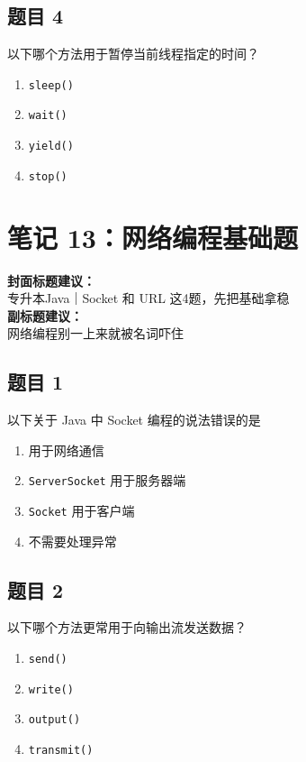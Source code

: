 \documentclass[12pt,a4paper]{ctexart}
\begin{document}
\subsection*{题目 4}
以下哪个方法用于暂停当前线程指定的时间？
\begin{enumerate}[label=\Alph*.]
    \item \texttt{sleep()}
    \item \texttt{wait()}
    \item \texttt{yield()}
    \item \texttt{stop()}
\end{enumerate}

\newpage

\section{笔记 13：网络编程基础题}
\begin{coverbox}
\textbf{封面标题建议：}\\
专升本Java｜Socket 和 URL 这4题，先把基础拿稳\\
\textbf{副标题建议：}\\
网络编程别一上来就被名词吓住
\end{coverbox}

\subsection*{题目 1}
以下关于 Java 中 Socket 编程的说法错误的是
\begin{enumerate}[label=\Alph*.]
    \item 用于网络通信
    \item \texttt{ServerSocket} 用于服务器端
    \item \texttt{Socket} 用于客户端
    \item 不需要处理异常
\end{enumerate}

\subsection*{题目 2}
以下哪个方法更常用于向输出流发送数据？
\begin{enumerate}[label=\Alph*.]
    \item \texttt{send()}
    \item \texttt{write()}
    \item \texttt{output()}
    \item \texttt{transmit()}
\end{enumerate}
\end{document}
